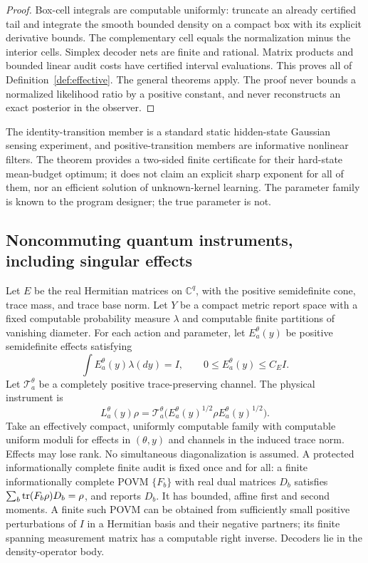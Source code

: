 \begin{proof}
Box-cell integrals are computable uniformly: truncate an already certified tail and integrate the smooth bounded density on a compact box with its explicit derivative bounds. The complementary cell equals the normalization minus the interior cells. Simplex decoder nets are finite and rational. Matrix products and bounded linear audit costs have certified interval evaluations. This proves all of Definition~\ref{def:effective}. The general theorems apply. The proof never bounds a normalized likelihood ratio by a positive constant, and never reconstructs an exact posterior in the observer.
\end{proof}

The identity-transition member is a standard static hidden-state Gaussian sensing experiment, and positive-transition members are informative nonlinear filters. The theorem provides a two-sided finite certificate for their hard-state mean-budget optimum; it does not claim an explicit sharp exponent for all of them, nor an efficient solution of unknown-kernel learning. The parameter family is known to the program designer; the true parameter is not.

\subsection{Noncommuting quantum instruments, including singular effects}
Let $E$ be the real Hermitian matrices on $\mathbb C^q$, with the positive semidefinite cone, trace mass, and trace base norm. Let $Y$ be a compact metric report space with a fixed computable probability measure $\lambda$ and computable finite partitions of vanishing diameter. For each action and parameter, let $E_a^\theta(y)$ be positive semidefinite effects satisfying
\begin{equation}\label{eq:effective-quantum-effects}
 \int E_a^\theta(y)\lambda(dy)=I,\qquad
 0\le E_a^\theta(y)\le C_EI.
\end{equation}
Let $\mathcal T_a^\theta$ be a completely positive trace-preserving channel. The physical instrument is
\begin{equation}\label{eq:effective-quantum}
 L_a^\theta(y)\rho=
 \mathcal T_a^\theta\bigl(E_a^\theta(y)^{1/2}\rho E_a^\theta(y)^{1/2}\bigr).
\end{equation}
Take an effectively compact, uniformly computable family with computable uniform moduli for effects in $(\theta,y)$ and channels in the induced trace norm. Effects may lose rank. No simultaneous diagonalization is assumed. A protected informationally complete finite audit is fixed once and for all: a finite informationally complete POVM $\{F_b\}$ with real dual matrices $D_b$ satisfies $\sum_b\operatorname{tr}(F_b\rho)D_b=\rho$, and reports $D_b$. It has bounded, affine first and second moments. A finite such POVM can be obtained from sufficiently small positive perturbations of $I$ in a Hermitian basis and their negative partners; its finite spanning measurement matrix has a computable right inverse. Decoders lie in the density-operator body.

